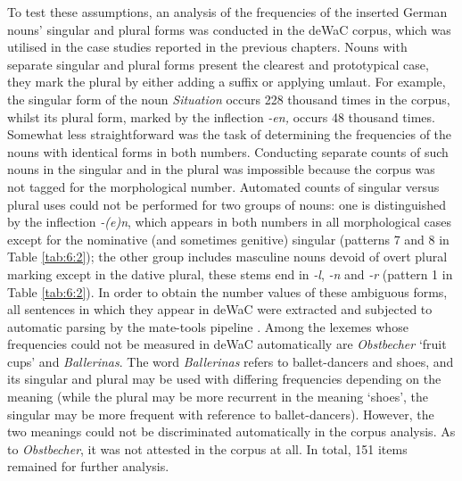 To test these assumptions, an analysis of the frequencies of the inserted German nouns’ singular and plural forms was conducted in the deWaC corpus, which was utilised in the case studies reported in the previous chapters. Nouns with separate singular and plural forms present the clearest and prototypical case, they mark the plural by either adding a suffix or applying umlaut. For example, the singular form of the noun \textit{Situation} occurs 228 thousand times in the corpus, whilst its plural form, marked by the inflection \textit{-en,} occurs 48 thousand times. Somewhat less straightforward was the task of determining the frequencies of the nouns with identical forms in both numbers. Conducting separate counts of such nouns in the singular and in the plural was impossible because the corpus was not tagged for the morphological number. Automated counts of singular versus plural uses could not be performed for two groups of nouns: one is distinguished by the inflection \textit{-(e)n}, which appears in both numbers in all morphological cases except for the nominative (and sometimes genitive) singular (patterns 7 and 8 in Table \ref{tab:6:2}); the other group includes masculine nouns devoid of overt plural marking except in the dative plural, these stems end in \textit{-l}, \textit{-n} and \textit{-r} (pattern 1 in Table \ref{tab:6:2}). In order to obtain the number values of these ambiguous forms, all sentences in which they appear in deWaC were extracted and subjected to automatic parsing by the mate-tools pipeline \citep{bjorkelund-etal10}. Among the lexemes whose frequencies could not be measured in deWaC automatically are \textit{Obstbecher} `fruit cups' and \textit{Ballerinas}. The word \textit{Ballerinas} refers to ballet-dancers and shoes, and its singular and plural may be used with differing frequencies depending on the meaning (while the plural may be more recurrent in the meaning ‘shoes’, the singular may be more frequent with reference to ballet-dancers). However, the two meanings could not be discriminated automatically in the corpus analysis. As to \textit{Obstbecher}, it was not attested in the corpus at all. In total, 151 items remained for further analysis.

